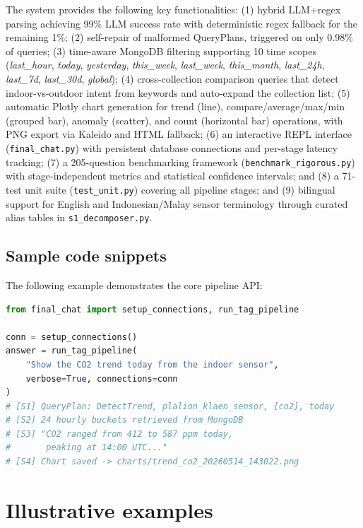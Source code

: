 \documentclass[preprint,12pt,a4paper]{elsarticle}
\begin{document}
The system provides the following key functionalities: (1) hybrid LLM+regex parsing achieving 99\% LLM success rate with deterministic regex fallback for the remaining 1\%; (2) self-repair of malformed QueryPlans, triggered on only 0.98\% of queries; (3) time-aware MongoDB filtering supporting 10 time scopes (\emph{last\_hour}, \emph{today}, \emph{yesterday}, \emph{this\_week}, \emph{last\_week}, \emph{this\_month}, \emph{last\_24h}, \emph{last\_7d}, \emph{last\_30d}, \emph{global}); (4) cross-collection comparison queries that detect indoor-vs-outdoor intent from keywords and auto-expand the collection list; (5) automatic Plotly chart generation for trend (line), compare/average/max/min (grouped bar), anomaly (scatter), and count (horizontal bar) operations, with PNG export via Kaleido and HTML fallback; (6) an interactive REPL interface (\texttt{final\_chat.py}) with persistent database connections and per-stage latency tracking; (7) a 205-question benchmarking framework (\texttt{benchmark\_rigorous.py}) with stage-independent metrics and statistical confidence intervals; and (8) a 71-test unit suite (\texttt{test\_unit.py}) covering all pipeline stages; and (9) bilingual support for English and Indonesian/Malay sensor terminology through curated alias tables in \texttt{s1\_decomposer.py}.

\subsection{Sample code snippets}

The following example demonstrates the core pipeline API:

\begin{lstlisting}[language=Python, basicstyle=\ttfamily\scriptsize, frame=single]
from final_chat import setup_connections, run_tag_pipeline

conn = setup_connections()
answer = run_tag_pipeline(
    "Show the CO2 trend today from the indoor sensor",
    verbose=True, connections=conn
)
# [S1] QueryPlan: DetectTrend, plalion_klaen_sensor, [co2], today
# [S2] 24 hourly buckets retrieved from MongoDB
# [S3] "CO2 ranged from 412 to 587 ppm today,
#       peaking at 14:00 UTC..."
# [S4] Chart saved -> charts/trend_co2_20260514_143022.png
\end{lstlisting}

\section{Illustrative examples}
\end{document}
